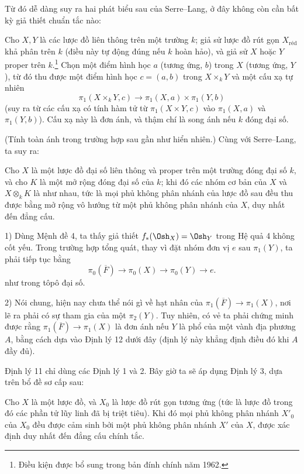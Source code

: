 Từ đó dễ dàng suy ra hai phát biểu sau của Serre--Lang, ở đây không còn cần
bất kỳ giả thiết chuẩn tắc nào:

 Cho $X,Y$ là các lược đồ liên thông trên một trường $k$;
giả sử lược đồ rút gọn $X_{\mathrm{réd}}$ khả phân trên $k$ (điều này tự động
đúng nếu $k$ hoàn hảo), và giả sử $X$ hoặc $Y$ proper trên
$k$.\footnote{Điều kiện được bổ sung trong bản đính chính năm 1962.} Chọn một
điểm hình học $a$ (tương ứng, $b$) trong $X$ (tương ứng, $Y$), từ đó thu được
một điểm hình học $c=(a,b)$ trong $X\times_kY$ và một cấu xạ tự nhiên
\[
  \pi_1(X\times_kY,c)\longrightarrow
  \pi_1(X,a)\times\pi_1(Y,b)
\]
(suy ra từ các cấu xạ có tính hàm tử từ $\pi_1(X\times Y,c)$ vào
$\pi_1(X,a)$ và $\pi_1(Y,b)$). Cấu xạ này là đơn ánh, và thậm chí là song ánh
nếu $k$ đóng đại số.

(Tính toàn ánh trong trường hợp sau gần như hiển nhiên.) Cùng với Serre--Lang,
ta suy ra:

 Cho $X$ là một lược đồ đại số liên thông và proper trên
một trường đóng đại số $k$, và cho $K$ là một mở rộng đóng đại số của $k$;
khi đó các nhóm cơ bản của $X$ và $X\otimes_kK$ là như nhau, tức là mọi phủ
không phân nhánh của lược đồ sau đều thu được bằng mở rộng vô hướng từ một phủ
không phân nhánh của $X$, duy nhất đến đẳng cấu.


1) Dùng Mệnh đề 4, ta thấy giả thiết $f_*(\Osh_X)=\Osh_Y$ trong Hệ quả 4 không
cốt yếu. Trong trường hợp tổng quát, thay vì đặt nhóm đơn vị $e$ sau
$\pi_1(Y)$, ta phải tiếp tục bằng
\[
  \pi_0(\overline F)\longrightarrow\pi_0(X)
  \longrightarrow\pi_0(Y)\longrightarrow e.
\]
như trong tôpô đại số.

2) Nói chung, hiện nay chưa thể nói gì về hạt nhân của
$\pi_1(\overline F)\longrightarrow\pi_1(X)$, nơi lẽ ra phải có sự tham gia của
một $\pi_2(Y)$. Tuy nhiên, có vẻ ta phải chứng minh được rằng
$\pi_1(\overline F)\longrightarrow\pi_1(X)$ là đơn ánh nếu $Y$ là phổ của một
vành địa phương $A$, bằng cách dựa vào Định lý 12 dưới đây (định lý này khẳng
định điều đó khi $A$ đầy đủ).

Định lý 11 chỉ dùng các Định lý 1 và 2. Bây giờ ta sẽ áp dụng Định lý 3, dựa
trên bổ đề sơ cấp sau:

 Cho $X$ là một lược đồ, và $X_0$ là lược đồ rút gọn tương
ứng (tức là lược đồ trong đó các phần tử lũy linh đã bị triệt tiêu). Khi đó mọi
phủ không phân nhánh $X'_0$ của $X_0$ đều được cảm sinh bởi một phủ không phân
nhánh $X'$ của $X$, được xác định duy nhất đến đẳng cấu chính tắc.

